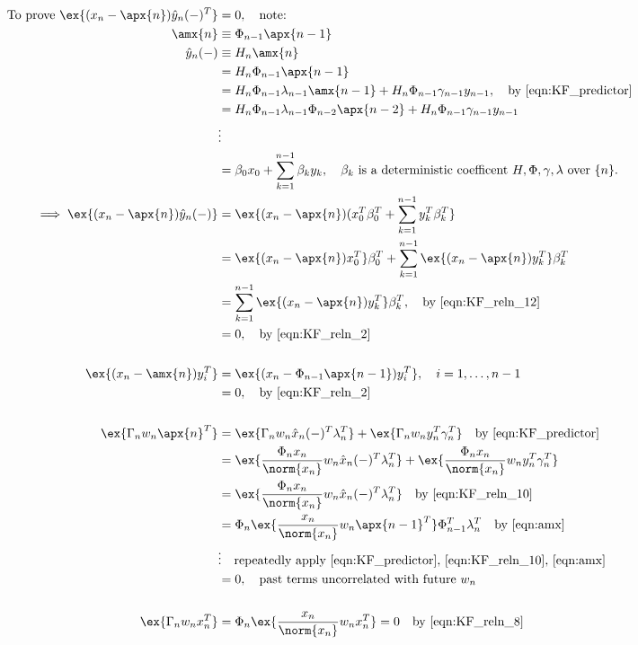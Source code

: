 \begin{align}
\text{To prove } \ex{(x_n - \apx{n})\hat{y}_n(-)^T} &=0, \quad \text{note:} \\
\amx{n} & \equiv \Phi_{n-1} \apx{n-1} \label{eqn:amx}\\
\hat{y}_n(-) & \equiv H_n \amx{n} \\
&= H_n \Phi_{n-1} \apx{n-1} \\
&= H_n \Phi_{n-1} \lambda_{n-1} \amx{n-1} + H_n \Phi_{n-1} \gamma_{n-1} y_{n-1}, \quad \text{by \ref{eqn:KF_predictor}} \\
&= H_n \Phi_{n-1} \lambda_{n-1} \Phi_{n-2} \apx{n-2} + H_n \Phi_{n-1} \gamma_{n-1} y_{n-1} \\
&\vdots \nonumber \\
& = \beta_0 x_0 + \sum_{k=1}^{n-1} \beta_k y_k, \quad \text{$\beta_k$ is a deterministic coefficent $H, \Phi, \gamma, \lambda$ over $\{n\}$.}\\
\implies \ex{(x_n - \apx{n})\hat{y}_n(-)} &= \ex{(x_n - \apx{n})(x_0^T\beta_0^T  + \sum_{k=1}^{n-1} y_k^T \beta_k^T } \\
&= \ex{(x_n - \apx{n})x_0^T}\beta_0^T  + \sum_{k=1}^{n-1} \ex{(x_n - \apx{n})y_k^T} \beta_k^T  \\
&= \sum_{k=1}^{n-1} \ex{(x_n - \apx{n})y_k^T} \beta_k^T, \quad \text{by \ref{eqn:KF_reln_12}}\\
&=0, \quad \text{by \ref{eqn:KF_reln_2}} \\
\nonumber \\ 
\ex{(x_n - \amx{n})y_i^T} &= \ex{(x_n - \Phi_{n-1} \apx{n-1})y_i^T}, \quad i = 1,\dots,n-1 \\
&=0, \quad \text{by \ref{eqn:KF_reln_2}} \\
\nonumber \\
\ex{\Gamma_n w_n \apx{n}^T} &=\ex{\Gamma_n w_n  \hat{x}_n(-)^T \lambda_n^T} +  \ex{\Gamma_n w_n  y_n^T \gamma_n^T} \quad \text{by \ref{eqn:KF_predictor}}\\
&=\ex{\frac{\Phi_{n}x_{n}}{\norm{x_{n}}} w_n  \hat{x}_n(-)^T \lambda_n^T} +  \ex{\frac{\Phi_{n}x_{n}}{\norm{x_{n}}} w_n  y_n^T \gamma_n^T} \\
&=\ex{\frac{\Phi_{n}x_{n}}{\norm{x_{n}}} w_n  \hat{x}_n(-)^T \lambda_n^T} \quad \text{by \ref{eqn:KF_reln_10}} \\
&=\Phi_{n}\ex{\frac{x_{n}}{\norm{x_{n}}} w_n \apx{n-1}^T} \Phi_{n-1}^T \lambda_n^T \quad \text{by \ref{eqn:amx}} \\
&\vdots \quad \text{repeatedly apply \ref{eqn:KF_predictor}, \ref{eqn:KF_reln_10}, \ref{eqn:amx}} \\
&=0, \quad \text{past terms uncorrelated with future $w_n$} \\
\nonumber \\ 
\ex{\Gamma_n w_n x_n^T} &= \Phi_{n}\ex{\frac{x_{n}}{\norm{x_{n}}} w_n x_n^T} =0 \quad \text{by \ref{eqn:KF_reln_8} } 
\end{align}